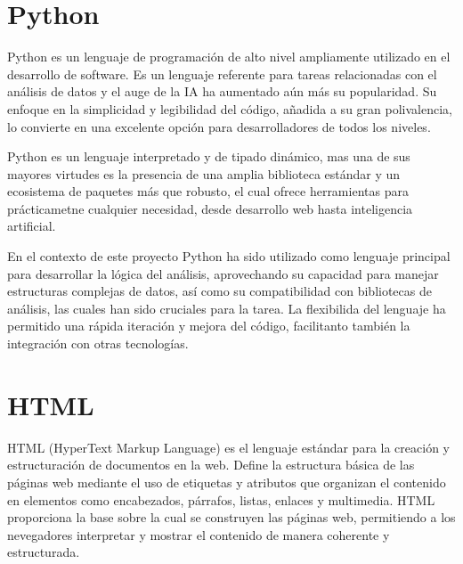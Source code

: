 \documentclass[a4paper, 12pt]{book}
\begin{document}


\section{Python}
Python es un lenguaje de programación de alto nivel ampliamente utilizado en el desarrollo de software. Es un lenguaje referente para tareas relacionadas con el análisis de datos y el auge de la IA ha aumentado aún más su popularidad. Su enfoque en la simplicidad y legibilidad del código, añadida a su gran polivalencia, lo convierte en una excelente opción para desarrolladores de todos los niveles.

Python es un lenguaje interpretado y de tipado dinámico, mas una de sus mayores virtudes es la presencia de una amplia biblioteca estándar y un ecosistema de paquetes más que robusto, el cual ofrece herramientas para prácticametne cualquier necesidad, desde desarrollo web hasta inteligencia artificial.

En el contexto de este proyecto Python ha sido utilizado como lenguaje principal para desarrollar la lógica del análisis, aprovechando su capacidad para manejar estructuras complejas de datos, así como su compatibilidad con bibliotecas de análisis, las cuales han sido cruciales para la tarea. La flexibilida del lenguaje ha permitido una rápida iteración y mejora del código, facilitanto también la integración con otras tecnologías.

\section{HTML}
HTML (HyperText Markup Language) es el lenguaje estándar para la creación y estructuración de documentos en la web. Define la estructura básica de las páginas web mediante el uso de etiquetas y atributos que organizan el contenido en elementos como encabezados, párrafos, listas, enlaces y multimedia. HTML proporciona la base sobre la cual se construyen las páginas web, permitiendo a los nevegadores interpretar y mostrar el contenido de manera coherente y estructurada.
\end{document}

